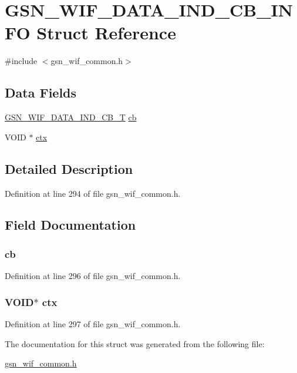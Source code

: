 \hypertarget{a00324}{
\section{GSN\_\-WIF\_\-DATA\_\-IND\_\-CB\_\-INFO Struct Reference}
\label{a00324}
}


{\ttfamily \#include $<$gsn\_\-wif\_\-common.h$>$}

\subsection*{Data Fields}
\begin{DoxyCompactItemize}
\item 
\hyperlink{a00635_gad46de129691b078bd6ff8df7f46318d2}{GSN\_\-WIF\_\-DATA\_\-IND\_\-CB\_\-T} \hyperlink{a00324_a416e89940deab9efea8452381a9d8d1d}{cb}
\item 
VOID $\ast$ \hyperlink{a00324_add401254b29adaa41706c97d1c8d3e89}{ctx}
\end{DoxyCompactItemize}


\subsection{Detailed Description}


Definition at line 294 of file gsn\_\-wif\_\-common.h.



\subsection{Field Documentation}
\hypertarget{a00324_a416e89940deab9efea8452381a9d8d1d}{
\subsubsection[{cb}]{ {\bf cb}}}
\label{a00324_a416e89940deab9efea8452381a9d8d1d}


Definition at line 296 of file gsn\_\-wif\_\-common.h.

\hypertarget{a00324_add401254b29adaa41706c97d1c8d3e89}{
\subsubsection[{ctx}]{\setlength{\rightskip}{0pt plus 5cm}VOID$\ast$ {\bf ctx}}}
\label{a00324_add401254b29adaa41706c97d1c8d3e89}


Definition at line 297 of file gsn\_\-wif\_\-common.h.



The documentation for this struct was generated from the following file:\begin{DoxyCompactItemize}
\item 
\hyperlink{a00608}{gsn\_\-wif\_\-common.h}\end{DoxyCompactItemize}
